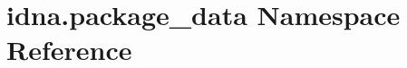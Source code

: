 \hypertarget{namespaceidna_1_1package__data}{}\section{idna.\+package\+\_\+data Namespace Reference}
\label{namespaceidna_1_1package__data}
